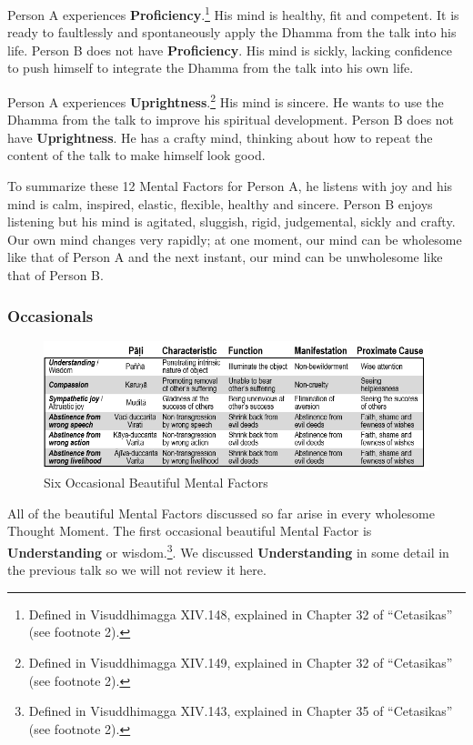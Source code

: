 Person A experiences \textbf{Proficiency}.\footnote{Defined in Visuddhimagga XIV.148, explained in Chapter 32 of “Cetasikas” (see footnote 2).} His mind is healthy, fit and competent. It is ready to faultlessly and spontaneously apply the Dhamma from the talk into his life. Person B does not have \textbf{Proficiency}. His mind is sickly, lacking confidence to push himself to integrate the Dhamma from the talk into his own life.

Person A experiences \textbf{Uprightness}.\footnote{Defined in Visuddhimagga XIV.149, explained in Chapter 32 of “Cetasikas” (see footnote 2).} His mind is sincere. He wants to use the Dhamma from the talk to improve his spiritual development. Person B does not have \textbf{Uprightness}. He has a crafty mind, thinking about how to repeat the content of the talk to make himself look good.

To summarize these 12 Mental Factors for Person A, he listens with joy and his mind is calm, inspired, elastic, flexible, healthy and sincere. Person B enjoys listening but his mind is agitated, sluggish, rigid, judgemental, sickly and crafty. Our own mind changes very rapidly; at one moment, our mind can be wholesome like that of Person A and the next instant, our mind can be unwholesome like that of Person B.

\subsubsection*{Occasionals}

\begin{figure}[h]
\centering
\includegraphics[width=0.8\linewidth]{./Diagrams/O-W}
\caption{Six Occasional Beautiful Mental Factors}
\label{fig:O-W}
\end{figure}

All of the beautiful Mental Factors discussed so far arise in every wholesome Thought Moment. The first occasional beautiful Mental Factor is \textbf{Understanding} or wisdom.\footnote{Defined in Visuddhimagga XIV.143, explained in Chapter 35 of “Cetasikas” (see footnote 2).}. We discussed \textbf{Understanding} in some detail in the previous talk so we will not review it here.

